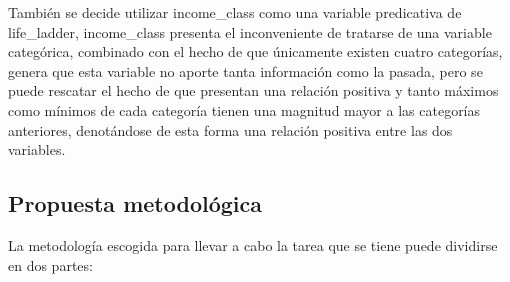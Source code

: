 También se decide utilizar income\_class como una variable predicativa de life\_ladder, income\_class presenta el inconveniente de tratarse de una variable categórica, combinado con el hecho de que únicamente existen cuatro categorías, genera que esta variable no aporte tanta información como la pasada, pero se puede rescatar el hecho de que presentan una relación positiva y tanto máximos como mínimos de cada categoría tienen una magnitud mayor a las categorías anteriores, denotándose de esta forma una relación positiva entre las dos variables.

\newpage
\subsection{Propuesta metodológica}
La metodología escogida para llevar a cabo la tarea que se tiene puede dividirse en dos partes:

